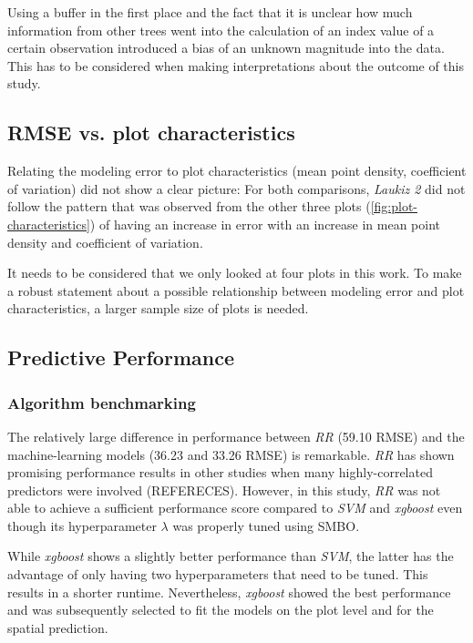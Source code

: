 \documentclass[review]{elsarticle}
\begin{document}
Using a buffer in the first place and the fact that it is unclear how much information from other trees went into the calculation of an index value of a certain observation introduced a bias of an unknown magnitude into the data.
This has to be considered when making interpretations about the outcome of this study.

\subsection{RMSE vs. plot characteristics}

\noindent Relating the modeling error to plot characteristics (mean point density, coefficient of variation) did not show a clear picture: For both comparisons, \textit{Laukiz 2} did not follow the pattern that was observed from the other three plots (\autoref{fig:plot-characteristics}) of having an increase in error with an increase in mean point density and coefficient of variation.

It needs to be considered that we only looked at four plots in this work.
To make a robust statement about a possible relationship between modeling error and plot characteristics, a larger sample size of plots is needed.

\subsection{Predictive Performance}

\subsubsection{Algorithm benchmarking}

\noindent The relatively large difference in performance between \textit{RR} (59.10 RMSE) and the machine-learning models (36.23 and 33.26 RMSE) is remarkable.
\textit{RR} has shown promising performance results in other studies when many highly-correlated predictors were involved (REFERECES).
However, in this study, \textit{RR} was not able to achieve a sufficient performance score compared to \textit{SVM} and \textit{xgboost} even though its hyperparameter $\lambda$ was properly tuned using SMBO.

While \textit{xgboost} shows a slightly better performance than \textit{SVM}, the latter has the advantage of only having two hyperparameters that need to be tuned.
This results in a shorter runtime.
Nevertheless, \textit{xgboost} showed the best performance and was subsequently selected to fit the models on the plot level and for the spatial prediction.
\end{document}
